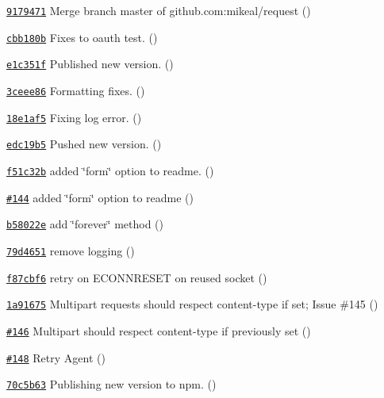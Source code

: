\begin{DoxyItemize}
\item \href{https://github.com/mikeal/request/commit/9179471f9f63b6ba9c9078a35cb888337ce295e8}{\tt 9179471} Merge branch \textquotesingle{}master\textquotesingle{} of github.\+com\+:mikeal/request ()
\item \href{https://github.com/mikeal/request/commit/cbb180b0399074995c235a555e3e3e162d738f7c}{\tt cbb180b} Fixes to oauth test. ()
\item \href{https://github.com/mikeal/request/commit/e1c351f92958634ccf3fbe78aa2f5b06d9c9a5fa}{\tt e1c351f} Published new version. ()
\item \href{https://github.com/mikeal/request/commit/3ceee86f1f3aad3a6877d6d3813e087549f3b485}{\tt 3ceee86} Formatting fixes. ()
\item \href{https://github.com/mikeal/request/commit/18e1af5e38168dcb95c8ae29bb234f1ad9bbbdf9}{\tt 18e1af5} Fixing log error. ()
\item \href{https://github.com/mikeal/request/commit/edc19b5249f655714efa0f8fa110cf663b742921}{\tt edc19b5} Pushed new version. ()
\item \href{https://github.com/mikeal/request/commit/f51c32bd6f4da0419ed8404b610c43ee3f21cf92}{\tt f51c32b} added \char`\"{}form\char`\"{} option to readme. ()
\item \href{https://github.com/mikeal/request/pull/144}{\tt \#144} added \char`\"{}form\char`\"{} option to readme ()
\item \href{https://github.com/mikeal/request/commit/b58022ecda782af93e35e5f9601013b90b09ca73}{\tt b58022e} add \char`\"{}forever\char`\"{} method ()
\item \href{https://github.com/mikeal/request/commit/79d46510ddff2e2c12c69f7ae4072ec489e27b0e}{\tt 79d4651} remove logging ()
\item \href{https://github.com/mikeal/request/commit/f87cbf6ec6fc0fc2869c340114514c887b304a80}{\tt f87cbf6} retry on E\+C\+O\+N\+N\+R\+E\+S\+E\+T on reused socket ()
\item \href{https://github.com/mikeal/request/commit/1a916757f4ec48b1282fddfa0aaa0fa6a1bf1267}{\tt 1a91675} Multipart requests should respect content-\/type if set; Issue \#145 ()
\item \href{https://github.com/mikeal/request/pull/146}{\tt \#146} Multipart should respect content-\/type if previously set ()
\item \href{https://github.com/mikeal/request/pull/148}{\tt \#148} Retry Agent ()
\item \href{https://github.com/mikeal/request/commit/70c5b63aca29a7d1629fa2909ff5b7199bbf0fd1}{\tt 70c5b63} Publishing new version to npm. ()

\end{DoxyItemize}
